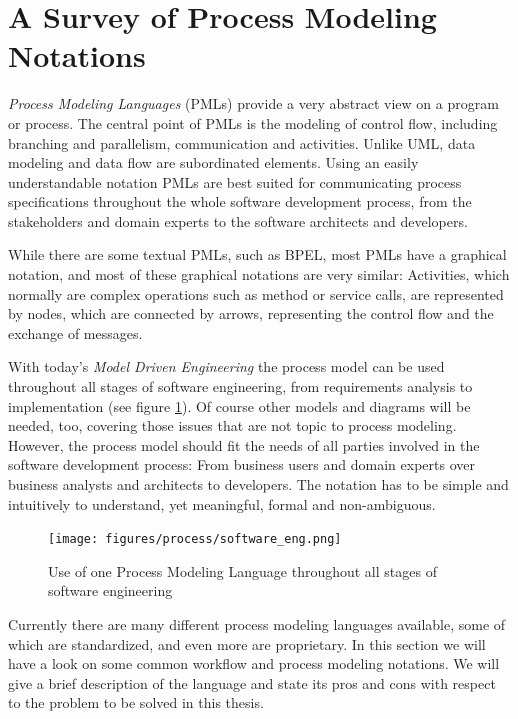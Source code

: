 \newpage
\section{A Survey of Process Modeling Notations}

\emph{Process Modeling Languages} (PMLs) provide a very abstract view on a program or process. The central point of PMLs is the modeling of control flow, including branching and parallelism, communication and activities. Unlike UML, data modeling and data flow are subordinated elements. Using an easily understandable notation PMLs are best suited for communicating process specifications throughout the whole software development process, from the stakeholders and domain experts to the software architects and developers.

While there are some textual PMLs, such as BPEL, most PMLs have a graphical notation, and most of these graphical notations are very similar: Activities, which normally are complex operations such as method or service calls, are represented by nodes, which are connected by arrows, representing the control flow and the exchange of messages.

With today's \emph{Model Driven Engineering} the process model can be used throughout all stages of software engineering, from requirements analysis to implementation (see figure \ref{fig:use_of_models}). Of course other models and diagrams will be needed, too, covering those issues that are not topic to process modeling. However, the process model should fit the needs of all parties involved in the software development process: From business users and domain experts over business analysts and architects to developers. The notation has to be simple and intuitively to understand, yet meaningful, formal and non-ambiguous. %

\begin{figure}[htp]
	\centering
	\texttt{[image: figures/process/software\_eng.png]}
	\caption[Use of one PML throughout software engineering]{Use of one Process Modeling Language throughout all stages of software engineering}
	\label{fig:use_of_models}
\end{figure}

Currently there are many different process modeling languages available, some of which are standardized, and even more are proprietary. In this section we will have a look on some common workflow and process modeling notations. We will give a brief description of the language and state its pros and cons with respect to the problem to be solved in this thesis.


